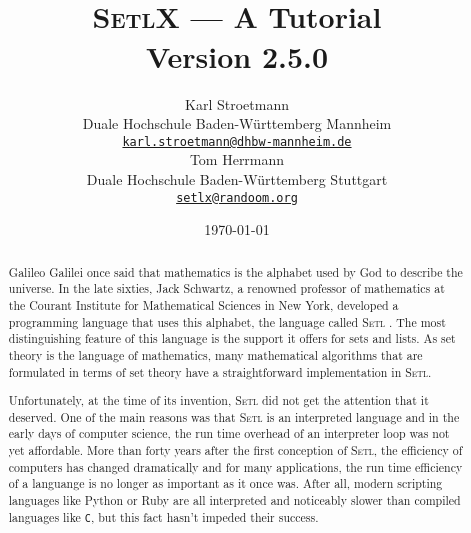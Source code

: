 \documentclass[twoside]{report}
\title{\vspace*{-1cm}
  \epsfig{file=aleph0,scale=0.21} \\[0.5cm]
\textsc{SetlX} --- A Tutorial \\[0.5cm]
Version 2.5.0
}
\author{Karl Stroetmann \\[0.2cm]
Duale Hochschule Baden-W\"urttemberg Mannheim \\[0.2cm]
\href{mailto:karl.stroetmann@dhbw-mannheim.de}{\texttt{karl.stroetmann@dhbw-mannheim.de}} \\[0.5cm]
 Tom Herrmann  \\[0.2cm]
Duale Hochschule Baden-W\"urttemberg Stuttgart \\[0.2cm]
\href{mailto:setlx@randoom.org}{\texttt{setlx@randoom.org}}
}
\date{\today}
\begin{document}
\maketitle

\begin{abstract}
Galileo Galilei once said that mathematics is the alphabet used by God to describe the universe.
In the late sixties, Jack Schwartz, a renowned professor of mathematics at the Courant Institute for
Mathematical Sciences in New York, developed a programming language that uses this alphabet, the
language called \textsc{Setl} \cite{schwartz:1970, setl86}.  The most distinguishing feature of this language is the
support it offers for sets and lists.   As set theory is the language of mathematics, many mathematical
algorithms that are formulated in terms of set theory have a straightforward implementation in
\textsc{Setl}. 

Unfortunately, at the time of its invention, \textsc{Setl} did not get the attention that it deserved.
One of the main reasons was that \textsc{Setl} is an interpreted language and in the early days of
computer science, the run time overhead of an interpreter loop was not yet affordable.  More than
forty years after the first conception of \textsc{Setl}, the efficiency of computers has changed
dramatically and for many applications, the run time efficiency of a languange is no
longer as important as it once was.  After all, 
modern scripting languages like Python \cite{vanRossum:95} or Ruby \cite{flanagan:2008}
are all interpreted and noticeably slower than compiled languages like \texttt{C}, but this
fact hasn't impeded their success. 


\end{abstract}
\end{document}
